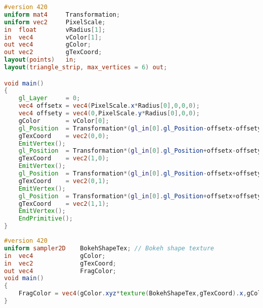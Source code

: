 \begin{lstlisting}[language=GLSL,float={htb},caption={Geometry shader for rendering bokeh \emph{(Pass 4)}.},label={Derousiers:renderingbokehgs}]
#version 420
uniform mat4     Transformation;
uniform vec2     PixelScale;
in  float        vRadius[1];
in  vec4         vColor[1];
out vec4         gColor;
out vec2         gTexCoord;
layout(points)   in;
layout(triangle_strip, max_vertices = 6) out;

void main()
{
	gl_Layer     = 0;
	vec4 offsetx = vec4(PixelScale.x*Radius[0],0,0,0);
	vec4 offsety = vec4(0,PixelScale.y*Radius[0],0,0);
	gColor       = vColor[0];
	gl_Position  = Transformation*(gl_in[0].gl_Position-offsetx-offsety);
	gTexCoord    = vec2(0,0);
	EmitVertex();
	gl_Position  = Transformation*(gl_in[0].gl_Position+offsetx-offsety);
	gTexCoord    = vec2(1,0);
	EmitVertex();
	gl_Position  = Transformation*(gl_in[0].gl_Position-offsetx+offsety);
	gTexCoord    = vec2(0,1);
	EmitVertex();
	gl_Position  = Transformation*(gl_in[0].gl_Position+offsetx+offsety);
	gTexCoord    = vec2(1,1);
	EmitVertex();
	EndPrimitive();
}
\end{lstlisting}

\begin{lstlisting}[language=GLSL,float={htb},caption={Fragment shader for rendering bokeh \emph{(Pass 4)}.},label={Derousiers:renderingbokehfs}]
#version 420
uniform sampler2D    BokehShapeTex; // Bokeh shape texture
in  vec4             gColor;
in  vec2             gTexCoord;
out vec4             FragColor;
void main()
{
	FragColor = vec4(gColor.xyz*texture(BokehShapeTex,gTexCoord).x,gColor.w);
}
\end{lstlisting}

















